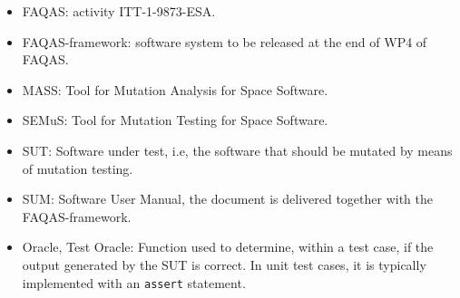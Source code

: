 \begin{itemize}
\item{FAQAS}: activity ITT-1-9873-ESA.
\item{FAQAS-framework}: software system to be released at the end of WP4 of FAQAS.
\item{MASS}: Tool for Mutation Analysis for Space Software.
\item{SEMuS}: Tool for Mutation Testing for Space Software.
\item{SUT}: Software under test, i.e, the software that should be mutated by means of mutation testing.
\item{SUM}: Software User Manual, the document is delivered together with the FAQAS-framework.
\item{Oracle, Test Oracle}: Function used to determine, within a test case, if the output generated by the SUT is correct. In unit test cases, it is typically implemented with an \texttt{assert} statement. 
\end{itemize}

\clearpage
